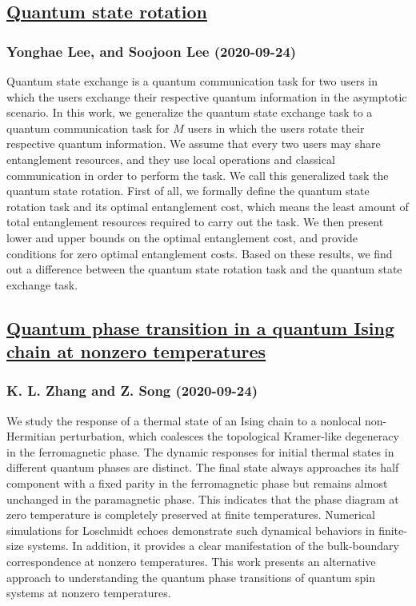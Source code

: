\subsection*{\href{http://arxiv.org/abs/2009.11539v1}{Quantum state rotation}}
\subsubsection*{Yonghae Lee, and Soojoon Lee (2020-09-24)}
Quantum state exchange is a quantum communication task for two users in which
the users exchange their respective quantum information in the asymptotic
scenario. In this work, we generalize the quantum state exchange task to a
quantum communication task for $M$ users in which the users rotate their
respective quantum information. We assume that every two users may share
entanglement resources, and they use local operations and classical
communication in order to perform the task. We call this generalized task the
quantum state rotation. First of all, we formally define the quantum state
rotation task and its optimal entanglement cost, which means the least amount
of total entanglement resources required to carry out the task. We then present
lower and upper bounds on the optimal entanglement cost, and provide conditions
for zero optimal entanglement costs. Based on these results, we find out a
difference between the quantum state rotation task and the quantum state
exchange task.

\subsection*{\href{http://arxiv.org/abs/2009.11529v1}{Quantum phase transition in a quantum Ising chain at nonzero  temperatures}}
\subsubsection*{K. L. Zhang and Z. Song (2020-09-24)}
We study the response of a thermal state of an Ising chain to a nonlocal
non-Hermitian perturbation, which coalesces the topological Kramer-like
degeneracy in the ferromagnetic phase. The dynamic responses for initial
thermal states in different quantum phases are distinct. The final state always
approaches its half component with a fixed parity in the ferromagnetic phase
but remains almost unchanged in the paramagnetic phase. This indicates that the
phase diagram at zero temperature is completely preserved at finite
temperatures. Numerical simulations for Loschmidt echoes demonstrate such
dynamical behaviors in finite-size systems. In addition, it provides a clear
manifestation of the bulk-boundary correspondence at nonzero temperatures. This
work presents an alternative approach to understanding the quantum phase
transitions of quantum spin systems at nonzero temperatures.

